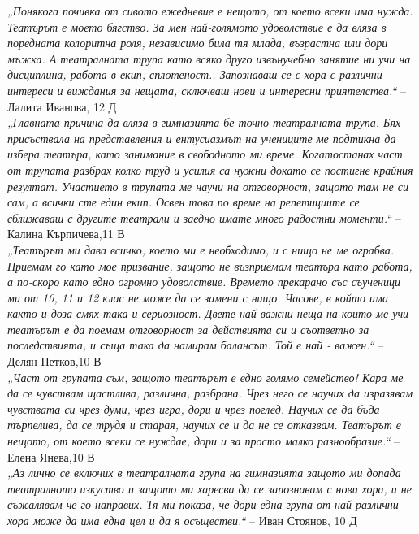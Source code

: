 \begin{multicols}{2}
\textit{„Понякога почивка от сивото ежедневие е нещото, от което всеки има нужда. Театърът е моето бягство. За мен най-голямото удоволствие е да вляза в поредната колоритна роля, независимо била тя млада, възрастна или дори мъжка. А театралната трупа като всяко друго извънучебно занятие ни учи на дисциплина, работа в екип, сплотеност.. Запознаваш се с хора с различни интереси и виждания за нещата, сключваш нови и интересни приятелства.“} – Лалита Иванова, 12 Д \\

\textit{„Главната причина да вляза в гимназията бе точно театралната трупа. Бях присъствала на представления и ентусиазмът на учениците ме подтикна да избера театъра, като занимание в свободното ми време. Когатостанах част от трупата разбрах колко труд и усилия са нужни докато се постигне крайния резултат. Участието в трупата ме научи на отговорност, защото там не си сам, а всички сте един екип. Освен това по време на репетициите се сближаваш с другите театрали и заедно имате много радостни моменти.“} – Калина Кърпичева,11 В \\

\textit{„Театърът ми  дава всичко, което ми е необходимо, и с нищо не ме ограбва. Приемам го като мое призвание, защото  не възприемам театъра като работа, а по-скоро като едно огромно удоволствие. Времето прекарано със съученици ми от 10, 11 и 12 клас не може да се замени с нищо. Часове, в който има както и доза смях така и сериозност. Двете най важни неща на които ме учи театърът е да поемам отговорност за действията си и съответно за последствията, и съща така да намирам балансът. Той е най - важен.“} – Делян Петков,10 В \\

\textit{„Част от групата съм, защото театърът е едно голямо семейство! Кара ме да се чувствам щастлива, различна, разбрана. Чрез него се научих да изразявам чувствата си чрез думи, чрез игра, дори и чрез поглед. Научих се да бъда търпелива, да се трудя и старая, научих се и да не се отказвам. Театърът е нещото, от което всеки се нуждае, дори и за просто малко разнообразие.“} – Елена Янева,10 В \\

\textit{„Аз лично се включих в театралната група на гимназията защото ми допада театралното изкуство и защото ми харесва да се запознавам с нови хора, и не съжалявам че го направих. Тя ми показа, че дори една  група от най-различни хора може да има една цел и да я осъществи.“ } – Иван Стоянов, 10 Д

\closearticle
\end{multicols}


